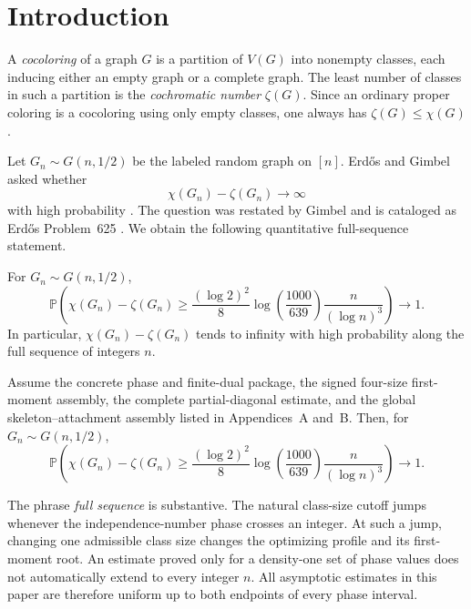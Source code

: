 \section*{Introduction}
\label{sec:introduction-v3}

A \emph{cocoloring} of a graph $G$ is a partition of $V(G)$ into nonempty
classes, each inducing either an empty graph or a complete graph. The least
number of classes in such a partition is the \emph{cochromatic number}
$\zeta(G)$. Since an ordinary proper coloring is a cocoloring using only empty
classes, one always has $\zeta(G)\le\chi(G)$.

Let $G_n\sim G(n,1/2)$ be the labeled random graph on $[n]$. Erd\H{o}s and
Gimbel asked whether
\[
  \chi(G_n)-\zeta(G_n)\longrightarrow\infty
\]
with high probability \citep[p.~263]{erdos-gimbel-1993}. The question was
restated by Gimbel \citep[Section~7.4]{gimbel-2016} and is cataloged as
Erd\H{o}s Problem~625 \citep{bloom-erdos625}. We obtain the following
quantitative full-sequence statement.

\ifErdosProofClosed
\begin{maintheorem}
For $G_n\sim G(n,1/2)$,
\[
  \mathbb P\!\left(
    \chi(G_n)-\zeta(G_n)
    \ge
    \frac{(\log 2)^2}{8}
    \log\!\left(\frac{1000}{639}\right)
    \frac{n}{(\log n)^3}
  \right)
  \longrightarrow 1.
\]
In particular, $\chi(G_n)-\zeta(G_n)$ tends to infinity with high probability
along the full sequence of integers $n$.
\end{maintheorem}
\else
\begin{maintheorem}
Assume the concrete phase and finite-dual package, the signed four-size
first-moment assembly, the complete partial-diagonal estimate, and the global
skeleton--attachment assembly listed in Appendices~A and~B. Then, for
$G_n\sim G(n,1/2)$,
\[
  \mathbb P\!\left(
    \chi(G_n)-\zeta(G_n)
    \ge
    \frac{(\log 2)^2}{8}
    \log\!\left(\frac{1000}{639}\right)
    \frac{n}{(\log n)^3}
  \right)
  \longrightarrow 1.
\]
\end{maintheorem}
\fi

The phrase \emph{full sequence} is substantive. The natural class-size cutoff
jumps whenever the independence-number phase crosses an integer. At such a
jump, changing one admissible class size changes the optimizing profile and
its first-moment root. An estimate proved only for a density-one set of phase
values does not automatically extend to every integer $n$. All asymptotic
estimates in this paper are therefore uniform up to both endpoints of every
phase interval.

